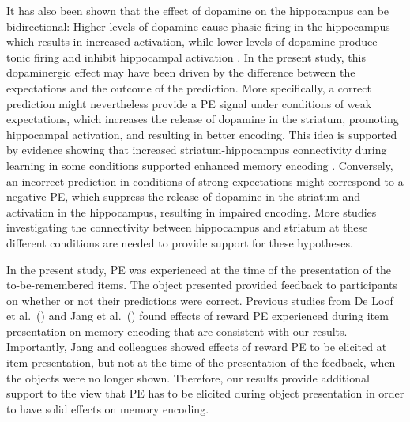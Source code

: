 \documentclass[a4paper,12pt]{article}
\begin{document}
It has also been shown that the effect of dopamine on the hippocampus can be bidirectional: Higher levels of dopamine cause phasic firing in the hippocampus which results in increased activation, while lower levels of dopamine produce tonic firing and inhibit hippocampal activation \citep{rosen2015midbrain}. In the present study, this dopaminergic effect may have been driven by the difference between the expectations and the outcome of the prediction. More specifically, a correct prediction might nevertheless provide a PE signal under conditions of weak expectations, which increases the release of dopamine in the striatum, promoting hippocampal activation, and resulting in better encoding. This idea is supported by evidence showing that increased striatum-hippocampus connectivity during learning in some conditions supported enhanced memory encoding \citep{Davidow2016}. Conversely, an incorrect prediction in conditions of strong expectations might correspond to a negative PE, which suppress the release of dopamine in the striatum and activation in the hippocampus, resulting in impaired encoding. More studies investigating the connectivity between hippocampus and striatum at these different conditions are needed to provide support for these hypotheses. 
\par 
In the present study, PE was experienced at the time of the presentation of the to-be-remembered items. The object presented provided feedback to participants on whether or not their predictions were correct. Previous studies from De Loof et al.\ (\citeyear{de2018signed}) and Jang et al.\ (\citeyear{Jang2019}) found effects of reward PE experienced during item presentation on memory encoding that are consistent with our results. Importantly, Jang and colleagues showed effects of reward PE to be elicited at item presentation, but not at the time of the presentation of the feedback, when the objects were no longer shown. Therefore, our results provide additional support to the view that PE has to be elicited during object presentation in order to have solid effects on memory encoding. 
\par
\end{document}
